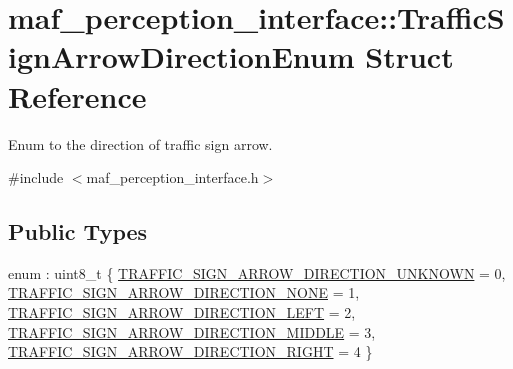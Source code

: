 \hypertarget{structmaf__perception__interface_1_1TrafficSignArrowDirectionEnum}{}\section{maf\+\_\+perception\+\_\+interface\+:\+:Traffic\+Sign\+Arrow\+Direction\+Enum Struct Reference}
\label{structmaf__perception__interface_1_1TrafficSignArrowDirectionEnum}


Enum to the direction of traffic sign arrow.  




{\ttfamily \#include $<$maf\+\_\+perception\+\_\+interface.\+h$>$}

\subsection*{Public Types}
\begin{DoxyCompactItemize}
\item 
enum \+: uint8\+\_\+t \{ \newline
\hyperlink{structmaf__perception__interface_1_1TrafficSignArrowDirectionEnum_a8d3a3c1beed99fc90ae6618f18f1d175a820eadccd5e9a956562ba9c4b12544c9}{T\+R\+A\+F\+F\+I\+C\+\_\+\+S\+I\+G\+N\+\_\+\+A\+R\+R\+O\+W\+\_\+\+D\+I\+R\+E\+C\+T\+I\+O\+N\+\_\+\+U\+N\+K\+N\+O\+WN} = 0, 
\hyperlink{structmaf__perception__interface_1_1TrafficSignArrowDirectionEnum_a8d3a3c1beed99fc90ae6618f18f1d175a46c6da0f22be940b72ad34ba9a02fe3b}{T\+R\+A\+F\+F\+I\+C\+\_\+\+S\+I\+G\+N\+\_\+\+A\+R\+R\+O\+W\+\_\+\+D\+I\+R\+E\+C\+T\+I\+O\+N\+\_\+\+N\+O\+NE} = 1, 
\hyperlink{structmaf__perception__interface_1_1TrafficSignArrowDirectionEnum_a8d3a3c1beed99fc90ae6618f18f1d175a9cb0859991e23fa7c11c3abc14a9929b}{T\+R\+A\+F\+F\+I\+C\+\_\+\+S\+I\+G\+N\+\_\+\+A\+R\+R\+O\+W\+\_\+\+D\+I\+R\+E\+C\+T\+I\+O\+N\+\_\+\+L\+E\+FT} = 2, 
\hyperlink{structmaf__perception__interface_1_1TrafficSignArrowDirectionEnum_a8d3a3c1beed99fc90ae6618f18f1d175a0936bfbf8ec6bb4ee7d6cf711c565a51}{T\+R\+A\+F\+F\+I\+C\+\_\+\+S\+I\+G\+N\+\_\+\+A\+R\+R\+O\+W\+\_\+\+D\+I\+R\+E\+C\+T\+I\+O\+N\+\_\+\+M\+I\+D\+D\+LE} = 3, 
\newline
\hyperlink{structmaf__perception__interface_1_1TrafficSignArrowDirectionEnum_a8d3a3c1beed99fc90ae6618f18f1d175a41602203bd3241e3cd33a1795f79273d}{T\+R\+A\+F\+F\+I\+C\+\_\+\+S\+I\+G\+N\+\_\+\+A\+R\+R\+O\+W\+\_\+\+D\+I\+R\+E\+C\+T\+I\+O\+N\+\_\+\+R\+I\+G\+HT} = 4
 \}
\end{DoxyCompactItemize}
